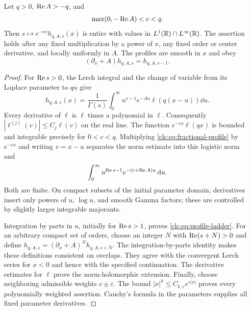 \begin{lemma}\label{clc:lem:weighted}
Let $q>0$, $\operatorname{Re} A>-q$, and
\begin{equation}\label{clc:eq:strip}
 \max(0,-\operatorname{Re} A)<c<q.
\end{equation}
Then $s\mapsto e^{-cx}h_{q,A,s}(x)$ is entire with values in
$L^1(\mathbb R)\cap L^\infty(\mathbb R)$. The assertion holds after any fixed
multiplication by a power of $x$, any fixed order or center derivative,
and locally uniformly in $A$. The profiles are smooth in $x$ and obey
\begin{equation}\label{clc:eq:profile-ladder}
 (\partial_x+A)h_{q,A,s}=h_{q,A,s-1}.
\end{equation}
\end{lemma}
\begin{proof}
For $\operatorname{Re} s>0$, the Lerch integral and the change of variable from its
Laplace parameter to $qu$ give
\begin{equation}\label{clc:eq:fractional-profile}
 h_{q,A,s}(x)=\frac1{\Gamma(s)}
 \int_0^\infty u^{s-1}e^{-Au}\ell(q(x-u))\dd u.
\end{equation}
Every derivative of $\ell$ is $\ell$ times a polynomial in $\ell$.
Consequently $|\ell^{(j)}(v)|\le C_j\ell(v)$ on the real line.
The function $e^{-cx}\ell(qx)$ is bounded and integrable precisely for
$0<c<q$. Multiplying \eqref{clc:eq:fractional-profile} by $e^{-cx}$ and
writing $v=x-u$ separates the norm estimate into this logistic norm and
\[
 \int_0^\infty u^{\operatorname{Re} s-1}e^{-(c+\operatorname{Re} A)u}\,\mathrm d u.
\]
Both are finite. On compact subsets of the initial parameter domain,
derivatives insert only powers of $u$, $\log u$, and smooth Gamma factors;
these are controlled by slightly larger integrable majorants.

Integration by parts in $u$, initially for $\operatorname{Re} s>1$, proves
\eqref{clc:eq:profile-ladder}. For an arbitrary compact set of orders,
choose an integer $N$ with $\operatorname{Re}(s+N)>0$ and define
$h_{q,A,s}=(\partial_x+A)^Nh_{q,A,s+N}$. The integration-by-parts identity
makes these definitions consistent on overlaps. They agree with the
convergent Lerch series for $x<0$ and hence with the specified continuation.
The derivative estimates for $\ell$ prove the norm-holomorphic extension.
Finally, choose neighboring admissible weights $c\pm\varepsilon$.
The bound $|x|^k\le C_{k,\varepsilon}e^{\varepsilon|x|}$ proves every
polynomially weighted assertion. Cauchy's formula in the parameters
supplies all fixed parameter derivatives.
\end{proof}

